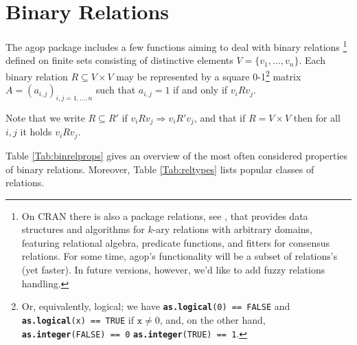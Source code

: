 \documentclass[11pt]{article}\usepackage[]{graphicx}\usepackage[]{color}
\newcommand{\hlkwd}[1]{\textcolor[rgb]{0.737,0.353,0.396}{\textbf{#1}}}%
\newcommand{\package}[1]{\textsf{#1}\xspace}
\newcommand{\Rfunc}[1]{\texttt{\hlkwd{#1}}}
\theoremstyle{remark}
\theoremstyle{definition}
\begin{document}
\section{Binary Relations}


The \package{agop} package includes a few functions
aiming to deal with binary relations%
\footnote{On CRAN there is also a package \package{relations},
see \cite{MeyerHornik2013:relationspkg}, that
provides data structures and algorithms for $k$-ary
relations with arbitrary domains, featuring relational algebra,
predicate functions, and fitters for consensus relations.
For some time, \package{agop}'s functionality will
be a subset of \package{relations}'s (yet faster).
In future versions, however, we'd like to add fuzzy relations
handling.} defined on finite sets consisting
of distinctive elements $V=\{v_1,\dots,v_n\}$.
Each binary relation $R\subseteq V\times V$ may
be represented by a square 0-1\footnote{Or, equivalently, logical;
we have \texttt{\Rfunc{as.logical}(0) == FALSE} and
\texttt{\Rfunc{as.logical}(x) == TRUE} if $\mathtt{x}\neq 0$,
and, on the other hand, \texttt{\Rfunc{as.integer}(FALSE) == 0}
\texttt{\Rfunc{as.integer}(TRUE) == 1}.}
matrix $A=(a_{i,j})_{i,j=1,\dots,n}$
such that $a_{i,j} = 1$ if and only if $v_i R v_j$.

Note that we write $R\subseteq R'$ if $v_i R v_j \Longrightarrow v_i R' v_j$,
and that if $R = V\times V$ then for all $i,j$ it holds $v_i R v_j$.

Table \ref{Tab:binrelprops} gives an overview of the most often
considered properties of binary relations.
Moreover, Table \ref{Tab:reltypes} lists popular classes of relations.
\end{document}
